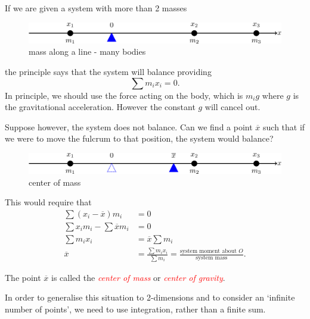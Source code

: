 \documentclass[
  11pt,
  oneside]{book}
\newcommand{\slide}{}
\theoremstyle{definition}
\theoremstyle{definition}
\theoremstyle{definition}
\theoremstyle{definition}
\theoremstyle{remark}
\begin{document}
\slide

If we are given a system with more than 2 masses

\begin{figure}

{\centering \includegraphics[width=0.6\linewidth]{tikztopng-figure35} 

}

\caption{mass along a line - many bodies}\label{fig:unnamed-chunk-68}
\end{figure}

the principle says that the system will balance providing
\[
\sum m_ix_i = 0.
\]
In principle, we should use the force acting on the body, which is \(m_ig\) where \(g\) is the gravitational acceleration. However the constant \(g\) will cancel out.
\slide
Suppose however, the system does not balance. Can we find a point \(\overline x\) such that if we were to move the fulcrum to that position, the system would balance?

\begin{figure}

{\centering \includegraphics[width=0.6\linewidth]{tikztopng-figure36} 

}

\caption{center of mass}\label{fig:unnamed-chunk-69}
\end{figure}

This would require that
\begin{align*}
\sum(x_i-\overline x)m_i& = 0\\
\sum x_i m_i-\sum{\overline x}m_i& = 0\\
\sum m_ix_i&=\overline x\sum m_i\\
\overline x&=\frac{\sum m_ix_i}{\sum m_i}=\frac{\text{system moment about $O$}}{\text{system mass}}.
\end{align*}

The point \(\overline x\) is called the \textcolor{red}{\em center of mass} or \textcolor{red}{\em center of gravity}.
\slide

In order to generalise this situation to 2-dimensions and to consider an `infinite number of points', we need to use integration, rather than a finite sum.
\end{document}

